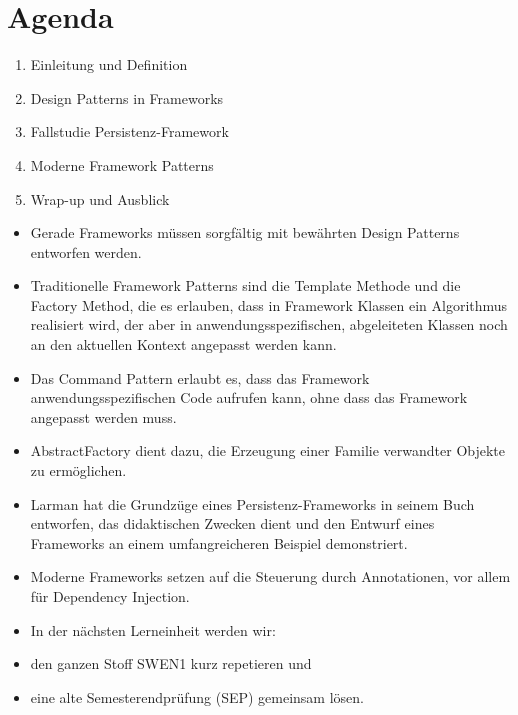 \section*{Agenda}
\begin{enumerate}
  \item Einleitung und Definition
  \item Design Patterns in Frameworks
  \item Fallstudie Persistenz-Framework
  \item Moderne Framework Patterns
  \item Wrap-up und Ausblick
\end{enumerate}

\begin{itemize}
  \item Gerade Frameworks müssen sorgfältig mit bewährten Design Patterns entworfen werden.
  \item Traditionelle Framework Patterns sind die Template Methode und die Factory Method, die es erlauben, dass in Framework Klassen ein Algorithmus realisiert wird, der aber in anwendungsspezifischen, abgeleiteten Klassen noch an den aktuellen Kontext angepasst werden kann.
  \item Das Command Pattern erlaubt es, dass das Framework anwendungsspezifischen Code aufrufen kann, ohne dass das Framework angepasst werden muss.
  \item AbstractFactory dient dazu, die Erzeugung einer Familie verwandter Objekte zu ermöglichen.
  \item Larman hat die Grundzüge eines Persistenz-Frameworks in seinem Buch entworfen, das didaktischen Zwecken dient und den Entwurf eines Frameworks an einem umfangreicheren Beispiel demonstriert.
  \item Moderne Frameworks setzen auf die Steuerung durch Annotationen, vor allem für Dependency Injection.
  \item In der nächsten Lerneinheit werden wir:
  \item den ganzen Stoff SWEN1 kurz repetieren und
  \item eine alte Semesterendprüfung (SEP) gemeinsam lösen.
\end{itemize}